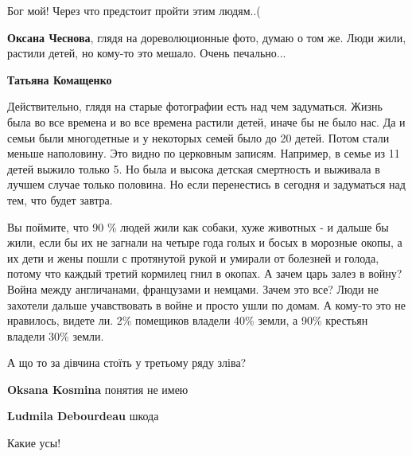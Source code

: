  
 
 
 
 

Бог мой! Через что предстоит пройти этим людям..(

\textbf{Оксана Чеснова}, глядя на дореволюционные фото, думаю о том же. Люди жили, растили детей, но кому-то это мешало. Очень печально...

\textbf{Татьяна Комащенко} 

Действительно, глядя на старые фотографии есть над чем задуматься. Жизнь была
во все времена и во все времена растили детей, иначе бы не было нас. Да и семьи
были многодетные и у некоторых семей было до 20 детей. Потом стали меньше
наполовину. Это видно по церковным записям. Например, в семье из 11 детей
выжило только 5. Но была и высока детская смертность и выживала в лучшем случае
только половина. Но если перенестись в сегодня и задуматься над тем, что будет
завтра.


Вы поймите, что 90 \% людей жили как собаки, хуже животных - и дальше бы жили, если
бы их не загнали на четыре года голых и босых в морозные окопы, а их дети и жены
пошли с протянутой рукой и умирали от болезней и голода, потому что каждый
третий кормилец гнил в окопах. А зачем царь залез в войну? Война между
англичанами, французами и немцами. Зачем это все? Люди не захотели дальше
учавствовать в войне и просто ушли по домам. А кому-то это не нравилось, видете
ли. 2\% помещиков владели 40\% земли, а 90\% крестьян владели 30\% земли.

А що то за дівчина стоїть у третьому ряду зліва?

\textbf{Oksana Kosmina} понятия не имею

\textbf{Ludmila Debourdeau} шкода

Какие усы!

